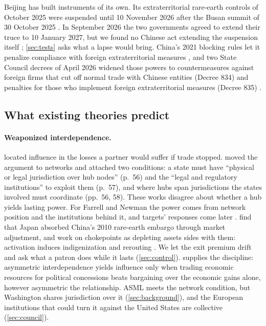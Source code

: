 Beijing has built instruments of its own. Its extraterritorial rare-earth controls of October 2025 \citep{mayerbrown2025rareearth} were suspended until 10 November 2026 after the Busan summit of 30 October 2025 \citep{whitehouse2025busan, mofcom2025pause}. In September 2026 the two governments agreed to extend their truce to 10 January 2027, but we found no Chinese act extending the suspension itself \citep{mofcom2026extension}; \cref{sec:tests} asks what a lapse would bring. China's 2021 blocking rules let it penalize compliance with foreign extraterritorial measures \citep{squire2026blocking, geopolitechs2026blocking}, and two State Council decrees of April 2026 widened those powers to countermeasures against foreign firms that cut off normal trade with Chinese entities (Decree 834) and penalties for those who implement foreign extraterritorial measures (Decree 835) \citep{statecouncil2026supplychain, reedsmith2026decree}.

\subsection{What existing theories predict}\label{sec:literature}

\paragraph{Weaponized interdependence.} \citet{hirschman1945national} located influence in the losses a partner would suffer if trade stopped. \citet{farrell2019weaponized} moved the argument to networks and attached two conditions: a state must have ``physical or legal jurisdiction over hub nodes'' (p.~56) and the ``legal and regulatory institutions'' to exploit them (p.~57), and where hubs span jurisdictions the states involved must coordinate (pp.~56, 58). These works disagree about whether a hub yields lasting power. For Farrell and Newman the power comes from network position and the institutions behind it, and targets' responses come later \citep[76]{farrell2019weaponized}. \citet{gholz2021market} find that Japan absorbed China's 2010 rare-earth embargo through market adjustment, and work on chokepoints as depleting assets sides with them: activation induces indigenization and rerouting \citep{tan2025driven, rajan2026eroding}. We let the exit premium drift and ask what a patron does while it lasts (\cref{sec:control}). \citet{wagner1988economic} supplies the discipline: asymmetric interdependence yields influence only when trading economic resources for political concessions beats bargaining over the economic gains alone, however asymmetric the relationship. ASML meets the network condition, but Washington shares jurisdiction over it (\cref{sec:background}), and the European institutions that could turn it against the United States are collective (\cref{sec:council}).

